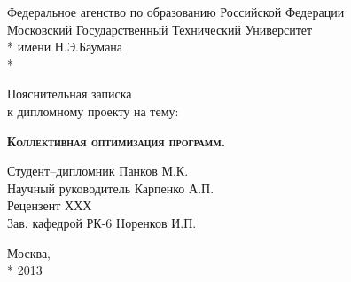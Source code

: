 \begin{titlepage}
\newpage

\begin{center}
Федеральное агенство по образованию Российской Федерации \\
\vspace{1cm}
Московский Государственный Технический Университет \\*
имени Н.Э.Баумана \\*
\hrulefill
\end{center}


\vspace{8em}

\begin{center}
\Large Пояснительная записка \\ к дипломному проекту на тему:
\end{center}

\vspace{2.5em}

\begin{center}
\textsc{\textbf{Коллективная оптимизация программ.}}
\end{center}

\vspace{6em}

\begin{flushleft}
Студент--дипломник \hrulefill Панков М.К. \\
\vspace{1.5em}
Научный руководитель \hrulefill Карпенко А.П.\\
\vspace{1.5em}
Рецензент \hrulefill ХХХ\\
\vspace{1.5em}
Зав. кафедрой РК-6 \hrulefill Норенков И.П.
\end{flushleft}

\vspace{\fill}

\begin{center}
Москва, \\*
2013
\end{center}

\end{titlepage}